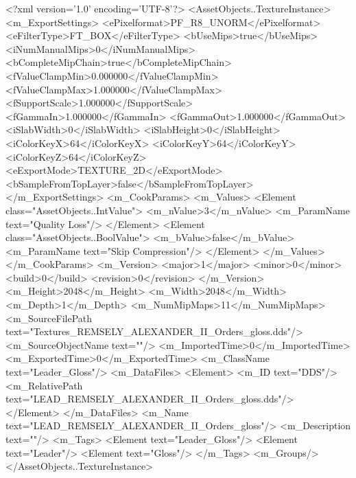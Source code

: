 <?xml version='1.0' encoding='UTF-8'?>
<AssetObjects..TextureInstance>
  <m_ExportSettings>
    <ePixelformat>PF_R8_UNORM</ePixelformat>
    <eFilterType>FT_BOX</eFilterType>
    <bUseMips>true</bUseMips>
    <iNumManualMips>0</iNumManualMips>
    <bCompleteMipChain>true</bCompleteMipChain>
    <fValueClampMin>0.000000</fValueClampMin>
    <fValueClampMax>1.000000</fValueClampMax>
    <fSupportScale>1.000000</fSupportScale>
    <fGammaIn>1.000000</fGammaIn>
    <fGammaOut>1.000000</fGammaOut>
    <iSlabWidth>0</iSlabWidth>
    <iSlabHeight>0</iSlabHeight>
    <iColorKeyX>64</iColorKeyX>
    <iColorKeyY>64</iColorKeyY>
    <iColorKeyZ>64</iColorKeyZ>
    <eExportMode>TEXTURE_2D</eExportMode>
    <bSampleFromTopLayer>false</bSampleFromTopLayer>
  </m_ExportSettings>
  <m_CookParams>
    <m_Values>
      <Element class="AssetObjects..IntValue">
        <m_nValue>3</m_nValue>
        <m_ParamName text="Quality Loss"/>
      </Element>
      <Element class="AssetObjects..BoolValue">
        <m_bValue>false</m_bValue>
        <m_ParamName text="Skip Compression"/>
      </Element>
    </m_Values>
  </m_CookParams>
  <m_Version>
    <major>1</major>
    <minor>0</minor>
    <build>0</build>
    <revision>0</revision>
  </m_Version>
  <m_Height>2048</m_Height>
  <m_Width>2048</m_Width>
  <m_Depth>1</m_Depth>
  <m_NumMipMaps>11</m_NumMipMaps>
  <m_SourceFilePath text="Textures\LEAD_REMSELY_ALEXANDER_II_Orders_gloss.dds"/>
  <m_SourceObjectName text=""/>
  <m_ImportedTime>0</m_ImportedTime>
  <m_ExportedTime>0</m_ExportedTime>
  <m_ClassName text="Leader_Gloss"/>
  <m_DataFiles>
    <Element>
      <m_ID text="DDS"/>
      <m_RelativePath text="LEAD_REMSELY_ALEXANDER_II_Orders_gloss.dds"/>
    </Element>
  </m_DataFiles>
  <m_Name text="LEAD_REMSELY_ALEXANDER_II_Orders_gloss"/>
  <m_Description text=""/>
  <m_Tags>
    <Element text="Leader_Gloss"/>
    <Element text="Leader"/>
    <Element text="Gloss"/>
  </m_Tags>
  <m_Groups/>
</AssetObjects..TextureInstance>
